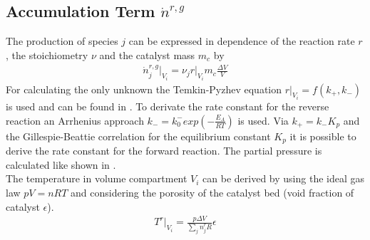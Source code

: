 \documentclass[paper=letter, fontsize=12pt]{article}
\begin{document}
\subsection{Accumulation Term $\dot{n}^{r,g}$ }
The production of species $j$ can be expressed in dependence of the reaction rate $r$, the stoichiometry $\nu$ and the catalyst mass $m_c$ by
\begin{align}
\dot{n}^{r,g}_j\Big|_{V_{i}}=\nu_j r\Big|_{V_i} m_c \frac{\Delta V}{V} \label{f:reactionrate}
\end{align}
For calculating the only unknown the Temkin-Pyzhev equation $r \Big|_{V_i}=f\left( k_+, k_- \right)$ is used and can be found in \cite{Jinasena2016}. To derivate the rate constant for the reverse reaction an Arrhenius approach \cite[p. 148]{Kamp1988} $k_-=k^-_0 exp\left( - \frac{E_{A}}{RT} \right)$ is used. Via $k_+=k_- K_p$ and the Gillespie-Beattie correlation for the equilibrium constant $K_p$ it is possible to derive the rate constant for the forward reaction. The partial pressure is calculated like shown in \cite{Kamp1988}.\\
The temperature in volume compartment $V_i$ can be derived by using the ideal gas law $pV=nRT$ and considering the porosity of the catalyst bed (void fraction of catalyst $\epsilon$).
\begin{align}
T^r \Big|_{V_i}=\frac{p \Delta V}{\sum_j n^r_j R} \epsilon \label{f:temperatureReactor}
\end{align}
\end{document}
